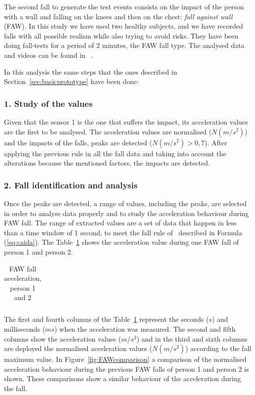\documentclass[journal]{IEEEtran}
\begin{document}
The second fall to generate the test events consists on the impact of the person with 
a wall and falling on the knees and then on the chest: \textit{fall against wall} (FAW). 
In this study we have used two healthy subjects, and we have recorded falls with all 
possible realism while also trying to avoid risks. They have been doing fall-tests for a period 
of 2 minutes, the FAW fall type. The analysed data and videos can be found in ~\cite{FallRepo}.

In this analysis the same steps that the ones described in Section~\ref{sec:basicprototype} 
have been done:

\subsubsection*{1. Study of the values} Given that the sensor 1 is the one that suffers the 
impact, its acceleration values are the first to be
analysed. The acceleration values are normalised ($N(m/s^2)$) and the impacts of the falls,
peaks are detected ($N(m/s^2) > 0,7$). After applying the previous rule in all the fall data 
and taking into account the alterations because the mentioned factors, the impacts are detected.

\subsubsection*{2. Fall identification and analysis} Once the peaks are detected, a range of values, 
including the peaks, are selected in order to analyse data properly and to study the acceleration 
behaviour during FAW fall. The range of extracted values are a set of data that happen in less 
than a time window of 1 second, to meet the fall rule of~\cite{Luder2009} described in 
Formula (\ref{eq:caida}). The Table~\ref{tabla:FAW} shows the 
acceleration value during one FAW fall of person 1 and person 2. 

\begin{table}[!ht]
 \centering
 \begin{tabular}{*{5}{r}}
   
 \end{tabular}
 \caption{FAW fall acceleration, person 1 and 2}%
 \label{tabla:FAW}
\end{table}

The first and fourth columns of the Table~\ref{tabla:FAW} represent
the seconds ($s$) and milliseconds 
($ms$) when the acceleration was measured. The second and fifth columns show the acceleration 
values  ($m/s^2$) and in the third and sixth columns are deployed the normalised acceleration values 
($N(m/s^2)$) according to the fall maximum value. In Figure~\ref{fig:FAWcomparison} a comparison 
of the normalised acceleration behaviour during the previous FAW falls of person 1 and person 2 is 
shown. These comparisons show a similar behaviour of the acceleration during the fall.
\end{document}
